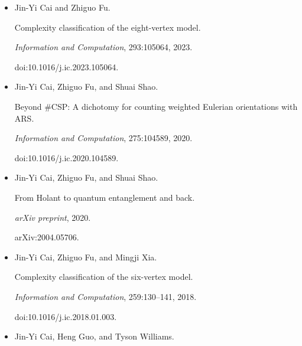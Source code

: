 \begin{itemize}
Jin-Yi Cai and Zhiguo Fu.


Holographic algorithm with matchgates is universal for planar \#CSP
over Boolean domain.


\emph{SIAM Journal on Computing}, 51(2):STOC17–50, 2019.





\item[] 
[7]

Jin-Yi Cai and Zhiguo Fu.


Complexity classification of the eight-vertex model.


\emph{Information and Computation}, 293:105064, 2023.


doi:10.1016/j.ic.2023.105064.





\item[] 
[8]

Jin-Yi Cai, Zhiguo Fu, and Shuai Shao.


Beyond \#CSP: A dichotomy for counting weighted Eulerian
orientations with ARS.


\emph{Information and Computation}, 275:104589, 2020.


doi:10.1016/j.ic.2020.104589.





\item[] 
[9]

Jin-Yi Cai, Zhiguo Fu, and Shuai Shao.


From Holant to quantum entanglement and back.


\emph{arXiv preprint}, 2020.


arXiv:2004.05706.





\item[] 
[10]

Jin-Yi Cai, Zhiguo Fu, and Mingji Xia.


Complexity classification of the six-vertex model.


\emph{Information and Computation}, 259:130–141, 2018.


doi:10.1016/j.ic.2018.01.003.





\item[] 
[11]

Jin-Yi Cai, Heng Guo, and Tyson Williams.



\end{itemize}
